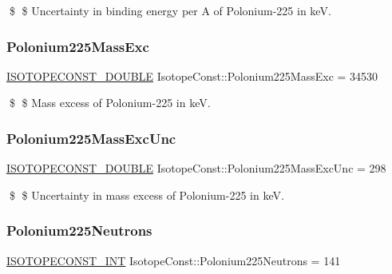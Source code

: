 \$ \$ Uncertainty in binding energy per A of Polonium-\/225 in keV. \mbox{\label{group___isotope_const-_polonium-_po225_ga697c6e530fc67d606d2932c96509e110}} 
\subsubsection{\texorpdfstring{Polonium225\+Mass\+Exc}{Polonium225MassExc}}
{\footnotesize\ttfamily \mbox{\hyperlink{group___isotope_const-_macros_ga8f45a7272ce02c0b4c65c44636ed719a}{I\+S\+O\+T\+O\+P\+E\+C\+O\+N\+S\+T\+\_\+\+D\+O\+U\+B\+LE}} Isotope\+Const\+::\+Polonium225\+Mass\+Exc = 34530}

\$ \$ Mass excess of Polonium-\/225 in keV. \mbox{\label{group___isotope_const-_polonium-_po225_ga474addb42d0742dcd9f17143fa4a514f}} 
\subsubsection{\texorpdfstring{Polonium225\+Mass\+Exc\+Unc}{Polonium225MassExcUnc}}
{\footnotesize\ttfamily \mbox{\hyperlink{group___isotope_const-_macros_ga8f45a7272ce02c0b4c65c44636ed719a}{I\+S\+O\+T\+O\+P\+E\+C\+O\+N\+S\+T\+\_\+\+D\+O\+U\+B\+LE}} Isotope\+Const\+::\+Polonium225\+Mass\+Exc\+Unc = 298}

\$ \$ Uncertainty in mass excess of Polonium-\/225 in keV. \mbox{\label{group___isotope_const-_polonium-_po225_ga0b874b7ba6405e30259bb3f525eac558}} 
\subsubsection{\texorpdfstring{Polonium225\+Neutrons}{Polonium225Neutrons}}
{\footnotesize\ttfamily \mbox{\hyperlink{group___isotope_const-_macros_ga5f18360b3e99483a35c32d789e62621c}{I\+S\+O\+T\+O\+P\+E\+C\+O\+N\+S\+T\+\_\+\+I\+NT}} Isotope\+Const\+::\+Polonium225\+Neutrons = 141}

